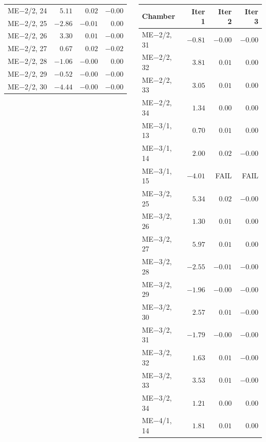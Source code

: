 \documentclass[compress]{beamer}
\begin{document}
\begin{frame}
\begin{columns}
\begin{tabular}{l r r r}
ME$-$2/2, 24 &  $ 5.11$ &  $ 0.02$ &  $-0.00$ \\
ME$-$2/2, 25 &  $-2.86$ &  $-0.01$ &  $ 0.00$ \\
ME$-$2/2, 26 &  $ 3.30$ &  $ 0.01$ &  $-0.00$ \\
ME$-$2/2, 27 &  $ 0.67$ &  $ 0.02$ &  $-0.02$ \\
ME$-$2/2, 28 &  $-1.06$ &  $-0.00$ &  $ 0.00$ \\
ME$-$2/2, 29 &  $-0.52$ &  $-0.00$ &  $-0.00$ \\
ME$-$2/2, 30 &  $-4.44$ &  $-0.00$ &  $-0.00$ \\
\end{tabular}

\begin{tabular}{l r r r}
Chamber & Iter 1 & Iter 2 & Iter 3 \\\hline
ME$-$2/2, 31 &  $-0.81$ &  $-0.00$ &  $-0.00$ \\
ME$-$2/2, 32 &  $ 3.81$ &  $ 0.01$ &  $ 0.00$ \\
ME$-$2/2, 33 &  $ 3.05$ &  $ 0.01$ &  $ 0.00$ \\
ME$-$2/2, 34 &  $ 1.34$ &  $ 0.00$ &  $ 0.00$ \\
ME$-$3/1, 13 &  $ 0.70$ &  $ 0.01$ &  $ 0.00$ \\
ME$-$3/1, 14 &  $ 2.00$ &  $ 0.02$ &  $-0.00$ \\
ME$-$3/1, 15 &  $-4.01$ &  FAIL &  FAIL \\
ME$-$3/2, 25 &  $ 5.34$ &  $ 0.02$ &  $-0.00$ \\
ME$-$3/2, 26 &  $ 1.30$ &  $ 0.01$ &  $ 0.00$ \\
ME$-$3/2, 27 &  $ 5.97$ &  $ 0.01$ &  $ 0.00$ \\
ME$-$3/2, 28 &  $-2.55$ &  $-0.01$ &  $-0.00$ \\
ME$-$3/2, 29 &  $-1.96$ &  $-0.00$ &  $-0.00$ \\
ME$-$3/2, 30 &  $ 2.57$ &  $ 0.01$ &  $-0.00$ \\
ME$-$3/2, 31 &  $-1.79$ &  $-0.00$ &  $-0.00$ \\
ME$-$3/2, 32 &  $ 1.63$ &  $ 0.01$ &  $-0.00$ \\
ME$-$3/2, 33 &  $ 3.53$ &  $ 0.01$ &  $-0.00$ \\
ME$-$3/2, 34 &  $ 1.21$ &  $ 0.00$ &  $ 0.00$ \\
ME$-$4/1, 14 &  $ 1.81$ &  $ 0.01$ &  $ 0.00$ \\
\end{tabular}
\end{columns}
\end{frame}
\end{document}
